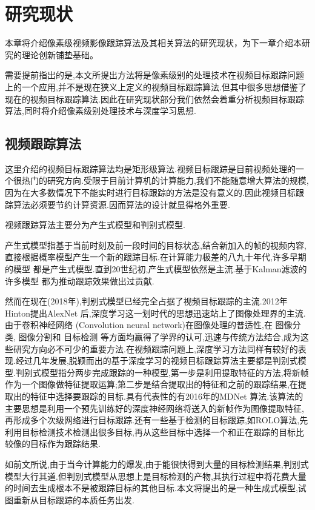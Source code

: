 
\chapter{研究现状}
本章将介绍像素级视频影像跟踪算法及其相关算法的研究现状，为下一章介绍本研究的理论创新铺垫基础。
\par
需要提前指出的是,本文所提出方法将是像素级别的处理技术在视频目标跟踪问题上的一个应用,并不是现在狭义上定义的视频目标跟踪算法.但其中很多思想借鉴了现在的视频目标跟踪算法.因此在研究现状部分我们依然会着重分析视频目标跟踪算法,同时将介绍像素级别处理技术与深度学习思想.

\section{视频跟踪算法}
这里介绍的视频目标跟踪算法均是矩形级算法.视频目标跟踪是目前视频处理的一个很热门的研究方向.受限于目前计算机的计算能力,我们不能随意增大算法的规模,因为在大多数情况下不能实时进行目标跟踪的方法是没有意义的.因此视频目标跟踪算法必须要节约计算资源.因而算法的设计就显得格外重要.
\par
视频跟踪算法主要分为产生式模型和判别式模型.
\par
产生式模型指基于当前时刻及前一段时间的目标状态,结合新加入的帧的视频内容,直接根据概率模型产生一个新的跟踪目标.在计算能力极差的八九十年代,许多早期的模型
\supercite{schalkoff1982model}
都是产生式模型.直到20世纪初,产生式模型依然是主流.基于Kalman滤波的许多模型
\supercite{kim2002fast, weng2006video, comaniciu2003kernel}
都为推动跟踪效果做出过贡献.
\par
然而在现在(2018年),判别式模型已经完全占据了视频目标跟踪的主流.2012年Hinton提出AlexNet 
\supercite{krizhevsky2012imagenet} 
后,深度学习这一划时代的思想迅速站上了图像处理界的主流.由于卷积神经网络
\supercite{krizhevsky2012imagenet} 
(Convolution neural network)在图像处理的普适性,在
图像分类\supercite{krizhevsky2012imagenet, witten2016data, he2016deep},
图像分割\supercite{long2015fully}和
目标检测\supercite{ren2015faster, redmon2016you}
等方面均赢得了学界的认可,迅速与传统方法结合,成为这些研究方向必不可少的重要方法.在视频跟踪问题上,深度学习方法同样有较好的表现.经过几年发展,脱颖而出的基于深度学习的视频目标跟踪算法主要都是判别式模型.判别式模型指分两步完成跟踪的一种模型,第一步是利用提取特征的方法,将新帧作为一个图像做特征提取运算;第二步是结合提取出的特征和之前的跟踪结果,在提取出的特征中选择要跟踪的目标.具有代表性的有2016年的MDNet \supercite{nam2016mdnet}算法.该算法的主要思想是利用一个预先训练好的深度神经网络将送入的新帧作为图像提取特征,再形成多个次级网络进行目标跟踪.还有一些基于检测的目标跟踪,如ROLO\supercite{ning2016spatially}算法,先利用目标检测技术检测出很多目标,再从这些目标中选择一个和正在跟踪的目标比较像的目标作为跟踪结果.
\par
如前文所说,由于当今计算能力的爆发,由于能很快得到大量的目标检测结果,判别式模型大行其道.但判别式模型从思想上是目标检测的产物,其执行过程中将花费大量的时间去生成根本不是被跟踪目标的其他目标.本文将提出的是一种生成式模型,试图重新从目标跟踪的本质任务出发.


